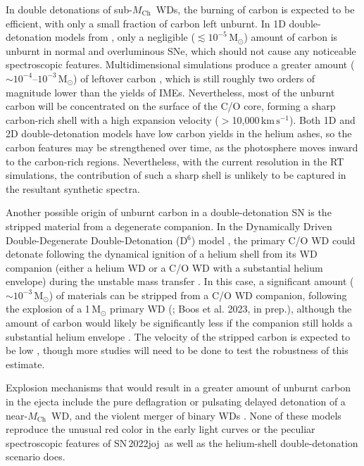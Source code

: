 \documentclass[twocolumn]{aastex631}
\newcommand{\sn}{SN\,2022joj}
\newcommand{\Mch}{$M_\mathrm{Ch}$}
\newcommand{\kms}{$\mathrm{km}\,\mathrm{s}^{-1}$}
\begin{document}
\begin{CJK*}{UTF8}{gbsn}
In double detonations of sub-\Mch\ WDs, the burning of carbon is expected to be efficient, with only a small fraction of carbon left unburnt. In 1D double-detonation models from \citet{polin_observational_2019}, only a negligible ($\lesssim$$10^{-5}\,\mathrm{M_\odot}$) amount of carbon is unburnt in normal and overluminous SNe, which should not cause any noticeable spectroscopic features. Multidimensional simulations produce a greater amount ($\sim$$10^{-4}$--$10^{-3}$\,$\mathrm{M_\odot}$) of leftover carbon \citep{Fink_DD_2010,Boos_2021}, which is still roughly two orders of magnitude lower than the yields of IMEs. Nevertheless, most of the unburnt carbon will be concentrated on the surface of the C/O core, forming a sharp carbon-rich shell \citep[see Figures~5--8 in][]{Boos_2021} with a high expansion velocity ($>$10,000\,\kms). Both 1D and 2D double-detonation models have low carbon yields in the helium ashes, so the carbon features may be strengthened over time, as the photosphere moves inward to the carbon-rich regions. Nevertheless, with the current resolution in the RT simulations, the contribution of such a sharp shell is unlikely to be captured in the resultant synthetic spectra. 

Another possible origin of unburnt carbon in a double-detonation SN is the stripped material from a degenerate companion. In the Dynamically Driven Double-Degenerate Double-Detonation (D$^6$) model \citep{Shen_2018}, the primary C/O WD could detonate following the dynamical ignition of a helium shell from its WD companion (either a helium WD or a C/O WD with a substantial helium envelope) during the unstable mass transfer \citep{Guillochon_2010,Pakmor_2013}. In this case, a significant amount ($\sim$$10^{-3}\,\mathrm{M_\odot}$) of materials can be stripped from a C/O WD companion, following the explosion of a 1\,$\mathrm{M_\odot}$ primary WD (\citealp{Tanikawa_2018}; Boos et al. 2023, in prep.), although the amount of carbon would likely be significantly less if the companion still holds a substantial helium envelope \citep{Tanikawa_2019}. The velocity of the stripped carbon is expected to be low \citep[e.g., centered at $\sim$3000\,\kms\ in][]{Tanikawa_2018}, though more studies will need to be done to test the robustness of this estimate.

Explosion mechanisms that would result in a greater amount of unburnt carbon in the ejecta include the pure deflagration \citep{Nomoto_1984b} or pulsating delayed detonation \citep{Hoeflich_1995,Dessart_2014} of a near-\Mch\ WD, and the violent merger of binary WDs \citep{Raskin_2014}. None of these models  reproduce the unusual red color in the early light curves or the peculiar spectroscopic features of \sn\ as well as the helium-shell double-detonation scenario does.


\end{CJK*}
\end{document}
